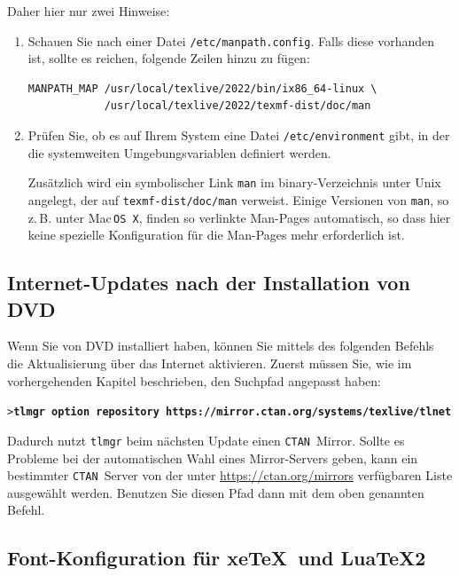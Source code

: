\documentclass[12pt,ngerman,a4paper,fullparskip]{report}
\newcommand{\acro}[1]{\texttt{#1}}
\newcommand{\cmdname}[1]{\texttt{#1}}
\newcommand{\code}[1]{\texttt{#1}}
\newcommand{\filename}[1]{\texttt{#1}}
\newcommand{\dirname}[1]{\texttt{#1}}
\newcommand{\Ucom}[1]{\textbf{\texttt{#1}}}
\providecommand*{\CTAN}{\acro{CTAN}\xspace}
\providecommand*{\MacOSX}{Mac\,\acro{OS\,X}\xspace}
\begin{document}
Daher hier nur zwei Hinweise: 

\begin{enumerate}
\item Schauen Sie nach einer Datei
\filename{/etc/manpath.config}. Falls diese vorhanden ist, sollte es reichen, folgende Zeilen
hinzu zu fügen:

\begin{verbatim}
MANPATH_MAP /usr/local/texlive/2022/bin/ix86_64-linux \
            /usr/local/texlive/2022/texmf-dist/doc/man
\end{verbatim}

\item Prüfen Sie, ob es auf Ihrem System eine Datei \filename{/etc/environment} gibt, in der die
systemweiten Umgebungsvariablen definiert werden.

Zusätzlich wird ein symbolischer Link \code{man} im binary-Verzeichnis unter
Unix angelegt, der auf \dirname{texmf-dist/doc/man} verweist. Einige Versionen von \code{man}, so z.\,B. unter \MacOSX, finden so verlinkte Man-Pages automatisch, so dass hier keine spezielle
Konfiguration für die Man-Pages mehr erforderlich ist.

\end{enumerate}

\subsection{Internet-Updates nach der Installation von DVD}
\label{sec:dvd-install-net-updates}


Wenn Sie von DVD installiert haben, können Sie mittels des folgenden Befehls die Aktualisierung über das Internet aktivieren. Zuerst müssen Sie, wie im vorhergehenden Kapitel beschrieben, den Suchpfad angepasst haben:

\begin{alltt}
> \Ucom{tlmgr option repository https://mirror.ctan.org/systems/texlive/tlnet}
\end{alltt}

\noindent Dadurch nutzt \cmdname{tlmgr} beim nächsten Update einen \CTAN\ Mirror. Sollte es Probleme bei der automatischen Wahl eines Mirror-Servers geben, kann ein bestimmter \CTAN\ Server von der unter \url{https://ctan.org/mirrors} verfügbaren Liste ausgewählt werden. Benutzen Sie diesen Pfad dann mit dem oben genannten Befehl.

\subsection{Font-Konfiguration für xe\TeX\ und Lua\TeX2}\label{sec:font-conf-xetex}
\end{document}
